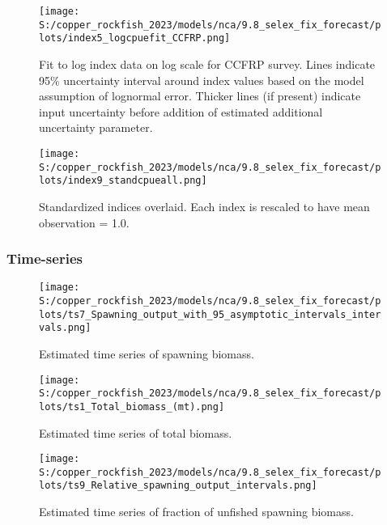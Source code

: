 \documentclass[11pt,
  english,
  letterpaper,
]{article}
\begin{document}
\pagebreak

\begin{figure}
\centering
\texttt{[image: S:/copper\_rockfish\_2023/models/nca/9.8\_selex\_fix\_forecast/plots/index5\_logcpuefit\_CCFRP.png]}
\caption{Fit to log index data on log scale for CCFRP survey. Lines indicate 95\% uncertainty interval around index values based on the model assumption of lognormal error. Thicker lines (if present) indicate input uncertainty before addition of estimated additional uncertainty parameter.\label{fig:ccfrp-index-fit}}
\end{figure}

\pagebreak

\begin{figure}
\centering
\texttt{[image: S:/copper\_rockfish\_2023/models/nca/9.8\_selex\_fix\_forecast/plots/index9\_standcpueall.png]}
\caption{Standardized indices overlaid. Each index is rescaled to have mean observation = 1.0.\label{fig:standardized-indices}}
\end{figure}

\pagebreak

\hypertarget{time-series}{%
\subsubsection{Time-series}\label{time-series}}

\begin{figure}
\centering
\texttt{[image: S:/copper\_rockfish\_2023/models/nca/9.8\_selex\_fix\_forecast/plots/ts7\_Spawning\_output\_with\_95\_asymptotic\_intervals\_intervals.png]}
\caption{Estimated time series of spawning biomass.\label{fig:ssb}}
\end{figure}

\pagebreak

\begin{figure}
\centering
\texttt{[image: S:/copper\_rockfish\_2023/models/nca/9.8\_selex\_fix\_forecast/plots/ts1\_Total\_biomass\_(mt).png]}
\caption{Estimated time series of total biomass.\label{fig:tot-bio}}
\end{figure}

\pagebreak

\begin{figure}
\centering
\texttt{[image: S:/copper\_rockfish\_2023/models/nca/9.8\_selex\_fix\_forecast/plots/ts9\_Relative\_spawning\_output\_intervals.png]}
\caption{Estimated time series of fraction of unfished spawning biomass.\label{fig:depl}}
\end{figure}
\end{document}
